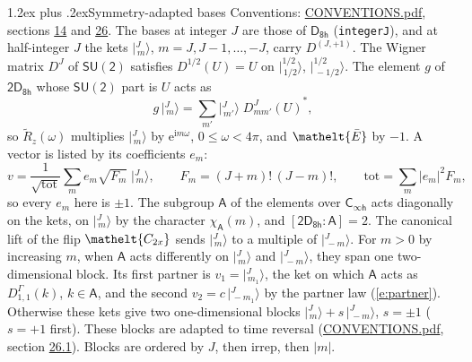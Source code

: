 \documentclass[10pt,a4paper]{article}
\makeatletter
\renewcommand\section{\@startsection{section}{1}{\z@}{-3ex plus -1ex minus -.2ex}%
  {1.2ex plus .2ex}{\normalfont\large\sffamily\bfseries\color{parttitle}}}
\numberwithin{equation}{section}
\newcommand{\eltfont}[1]{{\let\sigma\eltsigma\mathelt{#1}}}
\newcommand{\grp}[1]{\mathsf{#1}}
\newcommand{\elt}[1]{\eltfont{#1}}
\newcommand{\grpindex}[2]{[#1 : #2]}
\newcommand{\iunit}{\mathrm{i}}
\newcommand{\expe}{\mathrm{e}}
\newcommand{\irrJp}[2]{D^{(#1,#2)}}
\newcommand{\repD}[1]{D^{#1}}
\newcommand{\wignerD}[1]{D^{#1}}
\newcommand{\chiA}{\chi_{\grp{A}}}
\newcommand{\conj}[1]{{#1}^{*}}
\newcommand{\jm}[2]{\bigl\lvert{}^{#1}_{\,#2}\bigr\rangle}
\newcommand{\barred}[1]{\bar{#1}}
\newcommand{\lift}[1]{\tilde{#1}}
\makeatother
\begin{document}
\section{Symmetry-adapted bases}\label{s:bases}
Conventions: \href{../../CONVENTIONS.pdf}{CONVENTIONS.pdf}, sections \href{../../../rotation/CONVENTIONS.pdf\#conv.14}{14} and \href{../../CONVENTIONS.pdf\#conv.26}{26}.
\leavevmode\label{n:index.m}\label{n:vector.ket}The bases at integer $J$ are those of \href{../../../rotation/data/pdf/D8h.pdf}{$\grp{D_{8h}}$} (\texttt{integerJ}), and at half-integer $J$ the kets $\jm{J}{m}$, $m = J, J-1, \dots, -J$, carry $\irrJp{J}{+1}$. \label{n:matrix.wigner}The Wigner matrix $\wignerD{J}$ of $\grp{SU(2)}$ satisfies $\wignerD{1/2}(U) = U$ on $\jm{1/2}{1/2}$, $\jm{1/2}{-1/2}$. The element $g$ of $\grp{2D_{8h}}$ whose $\grp{SU(2)}$ part is $U$ acts as
\begin{equation}\label{e:action}g\,\jm{J}{m} = \sum_{m'} \jm{J}{m'}\; \conj{\wignerD{J}_{m m'}(U)},\end{equation}
so $\lift{R}_{z}(\omega)$ multiplies $\jm{J}{m}$ by $\expe^{\iunit m\omega}$, $0 \le \omega < 4\pi$, and $\elt{\barred{E}}$ by $-1$. \label{n:index.ketcoefficient}\label{n:vector.basis.symmetry}\label{n:index.ketweight}\label{n:index.total}A vector is listed by its coefficients $e_m$:
\begin{equation}\label{e:ket}v = \frac{1}{\sqrt{\mathrm{tot}}}\sum_m e_m\sqrt{F_m}\;\jm{J}{m},\qquad F_m = (J+m)!\,(J-m)!,\qquad \mathrm{tot} = \sum_m |e_m|^2F_m,\end{equation}
so every $e_m$ here is $\pm 1$.
\leavevmode\label{n:group.A}\label{n:function.character.abelian}The subgroup $\grp{A}$ of the elements over $\grp{C_{\infty h}}$ acts diagonally on the kets, on $\jm{J}{m}$ by the character $\chiA(m)$, and $\grpindex{\grp{2D_{8h}}}{\grp{A}} = 2$. The canonical lift of the flip $\elt{C_{2x}}$ sends $\jm{J}{m}$ to a multiple of $\jm{J}{-m}$. For $m > 0$ by increasing $m$, when $\grp{A}$ acts differently on $\jm{J}{m}$ and $\jm{J}{-m}$, they span one two-dimensional block. \label{n:index.partner.sign}Its first partner is $v_1 = \jm{J}{m_1}$, the ket on which $\grp{A}$ acts as $\repD{\Gamma}_{1,1}(k)$, $k \in \grp{A}$, and the second $v_2 = c\,\jm{J}{-m_1}$ by the partner law (\ref{e:partner}). \label{n:index.pair.sign}Otherwise these kets give two one-dimensional blocks $\jm{J}{m} + s\,\jm{J}{-m}$, $s = \pm 1$ ($s = +1$ first). These blocks are adapted to time reversal (\href{../../CONVENTIONS.pdf}{CONVENTIONS.pdf}, section \href{../../CONVENTIONS.pdf\#conv.26.1}{26.1}). Blocks are ordered by $J$, then irrep, then $|m|$.
\end{document}
